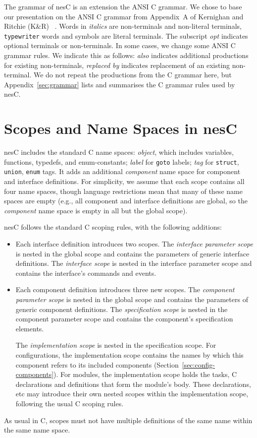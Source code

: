 \documentclass[11pt,letterpaper]{article}
\newcommand{\kw}[1]{{\tt #1}}
\newcommand{\nesc}{nesC\xspace}
\begin{document}
The grammar of \nesc is an extension the ANSI C grammar. We chose to base
our presentation on the ANSI C grammar from Appendix~A of Kernighan and
Ritchie (K\&R) ~\cite[pp234--239]{kandr}. Words in \emph{italics} are
non-terminals and non-literal terminals, \kw{typewriter} words and symbols
are literal terminals. The subscript \emph{opt} indicates optional
terminals or non-terminals. In some cases, we change some ANSI C grammar
rules. We indicate this as follows: \emph{also} indicates additional
productions for existing non-terminals, \emph{replaced by} indicates
replacement of an existing non-terminal. We do not repeat the productions
from the C grammar here, but Appendix~\ref{sec:grammar} lists and 
summarises the C grammar rules used by \nesc.


\section{Scopes and Name Spaces in \nesc}
\label{sec:scoping}

\nesc includes the standard C name spaces: \emph{object}, which includes
variables, functions, typedefs, and enum-constants; \emph{label} for
\kw{goto} labels; \emph{tag} for \kw{struct}, \kw{union}, \kw{enum} tags.
It adds an additional \emph{component} name space for component and
interface definitions. For simplicity, we assume that each scope contains
all four name spaces, though language restrictions mean that many of these
name spaces are empty (e.g., all component and interface definitions are
global, so the \emph{component} name space is empty in all but the global
scope).

\nesc follows the standard C scoping rules, with the following
additions:
\begin{itemize}
\item Each interface definition introduces two scopes. The \emph{interface
parameter scope} is nested in the global scope and contains the parameters
of generic interface definitions. The \emph{interface scope} is nested in
the interface parameter scope and contains the interface's commands and
events.

\item Each component definition introduces three new scopes. The
\emph{component parameter scope} is nested in the global scope and contains
the parameters of generic component definitions. The \emph{specification
scope} is nested in the component parameter scope and contains the
component's specification elements. 

The \emph{implementation scope} is nested in the specification scope.  For
configurations, the implementation scope contains the names by which this
component refers to its included components
(Section~\ref{sec:config-components}). For modules, the implementation
scope holds the tasks, C declarations and definitions that form the
module's body. These declarations, etc may introduce their own nested
scopes within the implementation scope, following the usual C scoping
rules.
\end{itemize}
As usual in C, scopes must not have multiple definitions of the same
name within the same name space.
\end{document}
